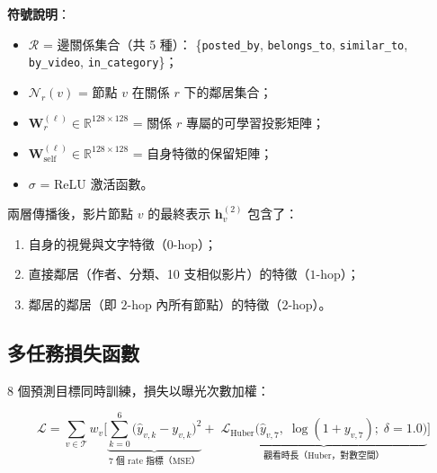 \documentclass[12pt, a4paper]{article}
\begin{document}
\textbf{符號說明}：
\begin{itemize}[leftmargin=*]
\item $\mathcal{R}$ = 邊關係集合（共 5 種）：
      \{\texttt{posted\_by}, \texttt{belongs\_to}, \texttt{similar\_to},
        \texttt{by\_video}, \texttt{in\_category}\}；
\item $\mathcal{N}_r(v)$ = 節點 $v$ 在關係 $r$ 下的鄰居集合；
\item $\mathbf{W}_r^{(\ell)} \in \mathbb{R}^{128\times128}$ = 關係 $r$ 專屬的可學習投影矩陣；
\item $\mathbf{W}_{\mathrm{self}}^{(\ell)} \in \mathbb{R}^{128\times128}$ = 自身特徵的保留矩陣；
\item $\sigma$ = ReLU 激活函數。
\end{itemize}

兩層傳播後，影片節點 $v$ 的最終表示 $\mathbf{h}_v^{(2)}$ 包含了：
\begin{enumerate}[leftmargin=*]
\item 自身的視覺與文字特徵（$0$-hop）；
\item 直接鄰居（作者、分類、10 支相似影片）的特徵（$1$-hop）；
\item 鄰居的鄰居（即 $2$-hop 內所有節點）的特徵（$2$-hop）。
\end{enumerate}

\subsection{多任務損失函數}

8 個預測目標同時訓練，損失以曝光次數加權：

\begin{equation}
  \mathcal{L} = \sum_{v\in\mathcal{T}} w_v \Biggl[
    \underbrace{
      \sum_{k=0}^{6}\bigl(\hat{y}_{v,k} - y_{v,k}\bigr)^2
    }_{\text{7 個 rate 指標（MSE）}}
    +\;
    \underbrace{
      \mathcal{L}_{\mathrm{Huber}}\!\bigl(
        \hat{y}_{v,7},\;\log(1+y_{v,7});\;\delta=1.0
      \bigr)
    }_{\text{觀看時長（Huber，對數空間）}}
  \Biggr]
  \label{eq:loss}
\end{equation}
\end{document}
